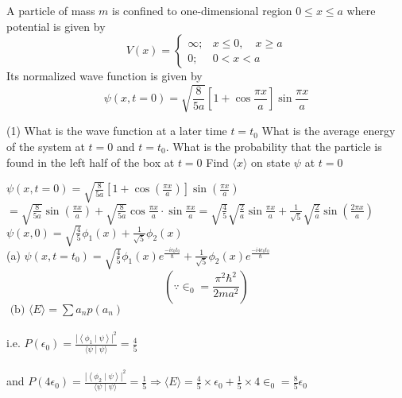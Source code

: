 \begin{enumerate}
\begin{answer}
\end{answer}
	\begin{minipage}{\textwidth}
	\item A particle of mass $m$ is confined to one-dimensional region $0 \leq x \leq a$ where potential is given by
	$$
	V(x)= \begin{cases}\infty ; & x \leq 0, \quad x \geq a \\ 0 ; & 0<x<a\end{cases}
	$$
	Its normalized wave function is given by
	$$
	\psi(x, t=0)=\sqrt{\frac{8}{5 a}}\left[1+\cos \frac{\pi x}{a}\right] \sin \frac{\pi x}{a}
	$$
	 \begin{tasks}(1)
		\task[\textbf{a.}] What is the wave function at a later time $t=t_{0}$
		\task[\textbf{b.}] What is the average energy of the system at $t=0$ and $t=t_{0}$.
		\task[\textbf{c.}]What is the probability that the particle is found in the left half of the box at $t=0$
		\task[\textbf{d.}]Find $\langle x\rangle$ on state $\psi$ at $t=0$ 
	\end{tasks}
\end{minipage}
\begin{answer}
$\psi(x, t=0)=\sqrt{\frac{8}{5 a}}\left[1+\cos \left(\frac{\pi x}{a}\right)\right] \sin \left(\frac{\pi x}{a}\right)$\\
$=\sqrt{\frac{8}{5 a}} \sin \left(\frac{\pi x}{a}\right)+\sqrt{\frac{8}{5 a}} \cos \frac{\pi x}{a} \cdot \sin \frac{\pi x}{a}=\sqrt{\frac{4}{5}} \sqrt{\frac{2}{a}} \sin \frac{\pi x}{a}+\frac{1}{\sqrt{5}} \sqrt{\frac{2}{a}} \sin \left(\frac{2 \pi x}{a}\right)$\\
$\psi(x, 0)=\sqrt{\frac{4}{5}} \phi_{1}(x)+\frac{1}{\sqrt{5}} \phi_{2}(x)$\\
(a) $\psi\left(x, t=t_{0}\right)=\sqrt{\frac{4}{5}} \phi_{1}(x) e^{\frac{-i \epsilon_{0} t_{0}}{\hbar}}+\frac{1}{\sqrt{5}} \phi_{2}(x) e^{\frac{-i 4 \epsilon_{0} t_{0}}{\hbar}}$
$$
\left(\because \in_{0}=\frac{\pi^{2} \hbar^{2}}{2 m a^{2}}\right)
$$
$\text { (b) }\langle E\rangle=\sum a_{n} p\left(a_{n}\right)$\\\\
i.e. $P\left(\epsilon_{0}\right)=\frac{\left|\left\langle\phi_{1} \mid \psi\right\rangle\right|^{2}}{\langle\psi \mid \psi\rangle}=\frac{4}{5}$\\\\
 and $P\left(4 \epsilon_{0}\right)=\frac{\left|\left\langle\phi_{2} \mid \psi\right\rangle\right|^{2}}{\langle\psi \mid \psi\rangle}=\frac{1}{5} \Rightarrow\langle E\rangle=\frac{4}{5} \times \epsilon_{0}+\frac{1}{5} \times 4 \in_{0}=\frac{8}{5} \epsilon_{0}$\\\\

\end{answer}
\end{enumerate}
